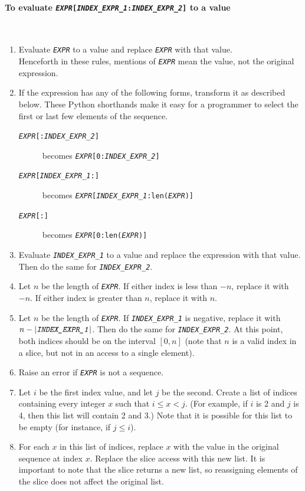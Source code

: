 \documentclass{article}
\newcommand{\expr}[1]{\texttt{#1}}
\newcommand{\mvar}[1]{\expr{\emph{\uppercase{#1}}}}
\newcommand{\myparagraph}[1]{\paragraph{#1} \ifhevea\else \strut \\ \strut \fi}
\begin{document}
  \myparagraph{To evaluate \expr{\mvar{EXPR}[\mvar{INDEX\_EXPR\_1}:\mvar{INDEX\_EXPR\_2}]} to a value}
  \begin{enumerate}
    \item
    Evaluate \mvar{EXPR} to a value and replace \mvar{EXPR} with that value. \\
    Henceforth in these rules, mentions of \mvar{EXPR} mean the value,
    not the original expression.

    \item
    If the expression has any of the following forms, transform it as
    described below.  These Python shorthands make it easy for a programmer
    to select the first or last few elements of the sequence.
    \begin{description}
      \item[\expr{\mvar{EXPR}[:\mvar{INDEX\_EXPR\_2}]}] becomes \expr{\mvar{EXPR}[0:\mvar{INDEX\_EXPR\_2}]}
      \item[\expr{\mvar{EXPR}[\mvar{INDEX\_EXPR\_1}:]}] becomes \expr{\mvar{EXPR}[\mvar{INDEX\_EXPR\_1}:len(\mvar{EXPR})]}
      \item[\expr{\mvar{EXPR}[:]}] becomes \expr{\mvar{EXPR}[0:len(\mvar{EXPR})]}
    \end{description}

    \item
    Evaluate \mvar{INDEX\_EXPR\_1} to a value and replace the expression with that value. Then do the same for \mvar{INDEX\_EXPR\_2}.

    \item
    Let $n$ be the length of \mvar{EXPR}.
    If either index is less than $-n$, replace it with $-n$. If either index is greater than $n$, replace it with $n$.

    \item
    Let $n$ be the length of \mvar{EXPR}.
    If \mvar{INDEX\_EXPR\_1} is negative, replace it with $n - \left|\mvar{INDEX\_EXPR\_1}\right|$.
    Then do the same for \mvar{INDEX\_EXPR\_2}. At this point, both indices should be on the interval $[0, n]$ (note that $n$ is a valid index in a slice, but not in an access to a single element).

    \item
    Raise an error if \mvar{EXPR} is not a sequence.

    \item
      Let $i$ be the first index value, and let $j$ be the second.  Create
      a list of indices containing every integer $x$ such that $i \le x <
      j$.  (For example, if $i$ is 2 and $j$ is 4, then this list will
      contain 2 and 3.)  Note that it is possible for this list to be empty
      (for instance, if $j \le i$).

    \item
    For each $x$ in this list of indices, replace $x$ with the value in the
    original sequence at index $x$.  Replace the slice access with this new
    list.  It is important to note that the slice returns a new list, so
    reassigning elements of the slice does not affect the original list.
  \end{enumerate}
\end{document}
